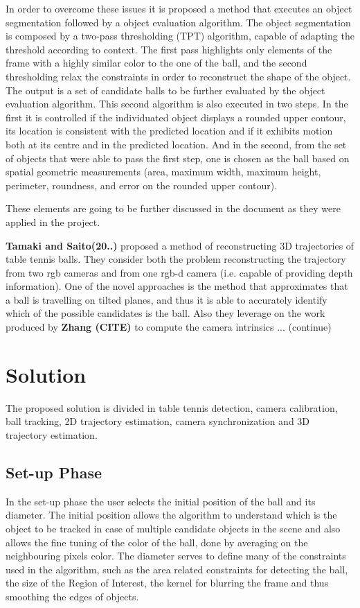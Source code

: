 \documentclass[a4paper]{article}
\begin{document}
In order to overcome these issues it is proposed a method that executes an object segmentation followed by a object evaluation algorithm. The object segmentation is composed by a two-pass thresholding (TPT) algorithm, capable of adapting the threshold according to context. The first pass highlights only elements of the frame with a highly similar color to the one of the ball, and the second thresholding relax the constraints in order to reconstruct the shape of the object. The output is a set of candidate balls to be further evaluated by the object evaluation algorithm. This second algorithm is also executed in two steps. In the first it is controlled if the individuated object displays a rounded upper  contour, its location is consistent with the predicted location and if it exhibits motion both at its centre and in the predicted location. And in the second, from the set of objects that were able to pass the first step, one is chosen as the ball based on spatial geometric measurements (area, maximum width, maximum height, perimeter, roundness, and error on the rounded upper contour).

These elements are going to be further discussed in the document as they were applied in the project. 

\textbf{Tamaki and Saito(20..)} proposed a method of reconstructing 3D trajectories of table tennis balls. They consider both the problem reconstructing the trajectory from two rgb cameras and from one rgb-d camera (i.e. capable of providing depth information). One of the novel approaches is the method that approximates that a ball is travelling on tilted planes, and thus it is able to accurately identify which of the possible candidates is the ball. Also they leverage on the work produced by\textbf{ Zhang (CITE)} to compute the camera intrinsics ... (continue)


\section{Solution}

The proposed solution is divided in table tennis detection, camera calibration, ball tracking, 2D trajectory estimation, camera synchronization and 3D trajectory estimation. 
\subsection{Set-up Phase}

	In the set-up phase the user selects the initial position of the ball and its diameter. The initial position allows the algorithm to understand which is the object to be tracked in case of multiple candidate objects in the scene and also allows the fine tuning of the color of the ball, done by averaging on the neighbouring pixels color. The diameter serves to define many of the constraints used in the algorithm, such as the area related constraints for detecting the ball, the size of the Region of Interest, the kernel for blurring the frame and thus smoothing the edges of objects. 
\end{document}
